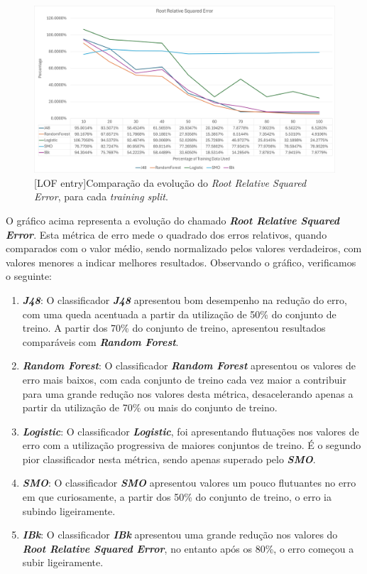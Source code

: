\documentclass{easychair}
\begin{document}
\begin{figure}[H]
    \begin{centering}
    \includegraphics[width=1\linewidth]{imagens/figure37.jpg}\label{cap-5-fig37}
    [LOF entry]{Comparação da evolução do \textit{Root Relative Squared Error}, para cada \textit{training split}.}
    \label{fig37}
    \end{centering}
\end{figure}

O gráfico acima representa a evolução do chamado \textit{\textbf{Root Relative Squared Error}}. Esta métrica de erro mede o quadrado dos erros relativos, quando comparados com o valor médio, sendo normalizado pelos valores verdadeiros, com valores menores a indicar melhores resultados. Observando o gráfico, verificamos o seguinte:

\begin{enumerate}
	\item \textbf{\textit{J48}}: O classificador \textit{\textbf{J48}} apresentou bom desempenho na redução do erro, com uma queda acentuada a partir da utilização de 50\% do conjunto de treino. A partir dos 70\% do conjunto de treino, apresentou resultados comparáveis com \textbf{\textit{Random Forest}}.
	\item \textbf{\textit{Random Forest}}: O classificador \textit{\textbf{Random Forest}} apresentou os valores de erro mais baixos, com cada conjunto de treino cada vez maior a contribuir para uma grande redução nos valores desta métrica, desacelerando apenas a partir da utilização de 70\% ou mais do conjunto de treino.
	\item \textbf{\textit{Logistic}}: O classificador \textit{\textbf{Logistic}}, foi apresentando flutuações nos valores de erro com a utilização progressiva de maiores conjuntos de treino. É o segundo pior classificador nesta métrica, sendo apenas superado pelo \textit{\textbf{SMO}}.
	\item \textbf{\textit{SMO}}: O classificador \textbf{\textit{SMO}} apresentou valores um pouco flutuantes no erro em que curiosamente, a partir dos 50\% do conjunto de treino, o erro ia subindo ligeiramente.
	\item \textbf{\textit{IBk}}: O classificador \textit{\textbf{IBk}} apresentou uma grande redução nos valores do  \textit{\textbf{Root Relative Squared Error}}, no entanto após os 80\%, o erro começou a subir ligeiramente.
\end{enumerate}
\end{document}
